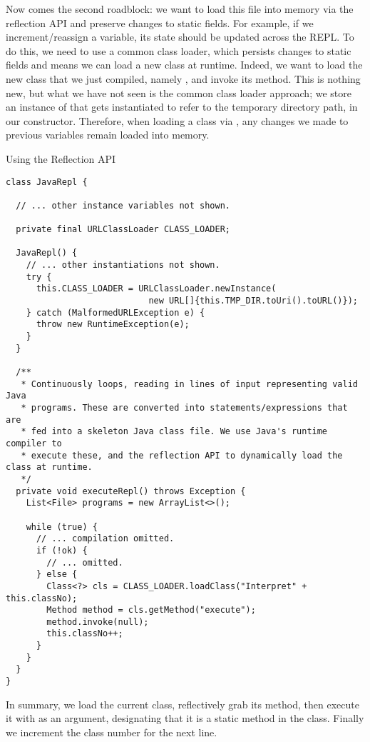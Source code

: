 Now comes the second roadblock: we want to load this file into memory via the reflection API and preserve changes to static fields. For example, if we increment/reassign a variable, its state should be updated across the REPL. To do this, we need to use a common class loader, which persists changes to static fields and means we can load a new class at runtime. Indeed, we want to load the new class that we just compiled, namely , and invoke its  method. This is nothing new, but what we have not seen is the common class loader approach; we store an instance of  that gets instantiated to refer to the temporary directory path, in our constructor. Therefore, when loading a class via , any changes we made to previous variables remain loaded into memory.

\begin{cl}[]{Using the Reflection API}
\begin{lstlisting}[language=MyJava]
class JavaRepl {

  // ... other instance variables not shown.

  private final URLClassLoader CLASS_LOADER;

  JavaRepl() {
    // ... other instantiations not shown.
    try {
      this.CLASS_LOADER = URLClassLoader.newInstance(
                            new URL[]{this.TMP_DIR.toUri().toURL()});
    } catch (MalformedURLException e) {
      throw new RuntimeException(e);
    }
  }

  /**
   * Continuously loops, reading in lines of input representing valid Java
   * programs. These are converted into statements/expressions that are
   * fed into a skeleton Java class file. We use Java's runtime compiler to
   * execute these, and the reflection API to dynamically load the class at runtime.
   */
  private void executeRepl() throws Exception {
    List<File> programs = new ArrayList<>();

    while (true) {
      // ... compilation omitted.
      if (!ok) {
        // ... omitted.
      } else {
        Class<?> cls = CLASS_LOADER.loadClass("Interpret" + this.classNo);
        Method method = cls.getMethod("execute");
        method.invoke(null);
        this.classNo++;
      }
    }
  }
}
\end{lstlisting}
\end{cl}

In summary, we load the current class, reflectively grab its  method, then execute it with  as an argument, designating that it is a static method in the class. Finally we increment the class number for the next line.